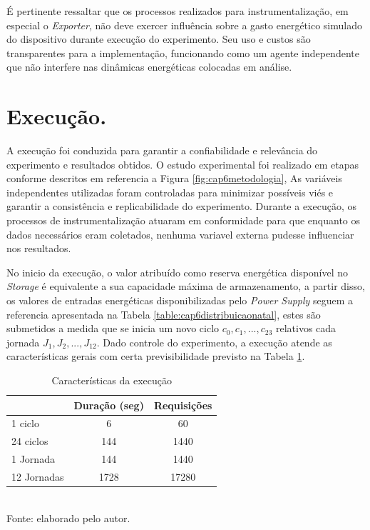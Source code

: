 É pertinente ressaltar que os processos realizados para instrumentalização, em especial o \textit{Exporter}, não deve exercer influência sobre a gasto energético simulado do dispositivo durante execução do experimento. Seu uso e custos são transparentes para a implementação, funcionando como um agente independente que não interfere nas dinâmicas energéticas colocadas em análise.

\section{Execução.}
\label{cap6:execucao}

A execução foi conduzida para garantir a confiabilidade e relevância do experimento e resultados obtidos. O estudo experimental foi realizado em etapas conforme descritos em referencia a Figura \ref{fig:cap6metodologia}, As variáveis independentes utilizadas foram controladas para minimizar possíveis viés e garantir a consistência e replicabilidade do experimento. Durante a execução, os processos de instrumentalização atuaram em conformidade para que enquanto os dados necessários eram coletados, nenhuma variavel externa pudesse influenciar nos resultados.


No inicio da execução, o valor atribuído como reserva energética disponível no \textit{Storage} é equivalente a sua capacidade máxima de armazenamento, a partir disso, os valores de entradas energéticas disponibilizadas pelo \textit{Power Supply} seguem a referencia apresentada na Tabela \ref{table:cap6distribuicaonatal}, estes são submetidos a medida que se inicia um novo ciclo $c_0, c_1,...,c_{23}$ relativos cada jornada $J_1, J_2, ..., J_{12}$. Dado controle do experimento, a execução atende as características gerais com certa previsibilidade previsto na Tabela \ref{table:cap6:execucaocaracteristicas}.

\begingroup

\begin{table}[h]
	
	\centering
	\caption{Características da execução}
	\begin{tabular}{ l | c c }
		
		    & Duração (seg)	& Requisições\\
		\hline
		1 ciclo  & 6 & 60 \\
		24 ciclos  & 144& 1440 \\
		1 Jornada  & 144& 1440 \\
		12 Jornadas  & 1728& 17280 \\
		\bottomrule
	\end{tabular}
	\label{table:cap6:execucaocaracteristicas}
	\\
	\footnotesize Fonte: elaborado pelo autor.
	
\end{table}
\endgroup

